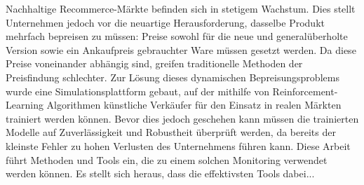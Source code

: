 Nachhaltige Recommerce-Märkte befinden sich in stetigem Wachstum. Dies stellt Unternehmen jedoch vor die neuartige Herausforderung, dasselbe Produkt mehrfach bepreisen zu müssen: Preise sowohl für die neue und generalüberholte Version sowie ein Ankaufpreis gebrauchter Ware müssen gesetzt werden. Da diese Preise voneinander abhängig sind, greifen traditionelle Methoden der Preisfindung schlechter. Zur Lösung dieses dynamischen Bepreisungsproblems wurde eine Simulationsplattform gebaut, auf der mithilfe von Reinforcement-Learning Algorithmen künstliche Verkäufer  für den Einsatz in realen Märkten trainiert werden können. Bevor dies jedoch geschehen kann müssen die trainierten Modelle auf Zuverlässigkeit und Robustheit  überprüft werden, da bereits der kleinste Fehler zu hohen Verlusten des Unternehmens führen kann. Diese Arbeit führt Methoden und Tools ein, die zu einem solchen Monitoring verwendet werden können. Es stellt sich heraus, dass die effektivsten Tools dabei... 